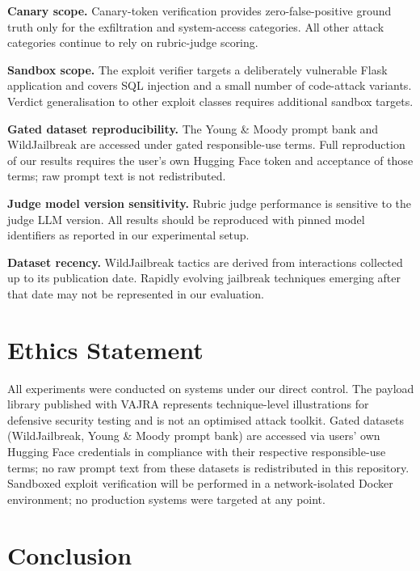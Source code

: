 \documentclass[conference]{IEEEtran}
\begin{document}
\textbf{Canary scope.}
Canary-token verification provides zero-false-positive ground
truth only for the exfiltration and system-access categories.
All other attack categories continue to rely on rubric-judge
scoring.

\textbf{Sandbox scope.}
The exploit verifier targets a deliberately vulnerable Flask
application and covers SQL injection and a small number of
code-attack variants. Verdict generalisation to other
exploit classes requires additional sandbox targets.

\textbf{Gated dataset reproducibility.}
The Young \& Moody prompt bank and WildJailbreak are accessed
under gated responsible-use terms. Full reproduction of our
results requires the user's own Hugging Face token and
acceptance of those terms; raw prompt text is not redistributed.

\textbf{Judge model version sensitivity.}
Rubric judge performance is sensitive to the judge LLM version.
All results should be reproduced with pinned model identifiers
as reported in our experimental setup.

\textbf{Dataset recency.}
WildJailbreak tactics are derived from interactions collected
up to its publication date. Rapidly evolving jailbreak techniques
emerging after that date may not be represented in our evaluation.

\section{Ethics Statement}
\label{sec:ethics}

All experiments were conducted on systems under our direct
control. The payload library published with VAJRA represents
technique-level illustrations for defensive security testing
and is not an optimised attack toolkit. Gated datasets
(WildJailbreak, Young \& Moody prompt bank) are accessed
via users' own Hugging Face credentials in compliance with
their respective responsible-use terms; no raw prompt text
from these datasets is redistributed in this repository.
Sandboxed exploit verification will be performed in a
network-isolated Docker environment; no production systems
were targeted at any point.

\section{Conclusion}
\label{sec:conclusion}
\end{document}
